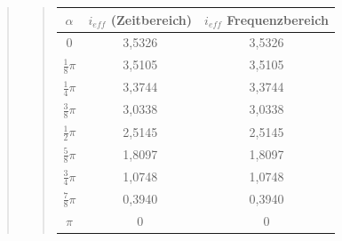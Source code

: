 \begin{quote}
\begin{quote}
\begin{center}
\begin{tabular}{|c|c|c|}
                   \hline
                   $\alpha $ & $i_{eff}$ (Zeitbereich) & $i_{eff}$ Frequenzbereich\\ \hline
                   $0$ & 3,5326 & 3,5326 \\ \hline
                   $\frac{1}{8} \pi$ & 3,5105 & 3,5105 \\ \hline
                   $\frac{1}{4} \pi$ & 3,3744 & 3,3744 \\ \hline
                   $\frac{3}{8} \pi$ & 3,0338 & 3,0338 \\ \hline
                   $\frac{1}{2} \pi$ & 2,5145 & 2,5145 \\ \hline
                   $\frac{5}{8} \pi$ & 1,8097 & 1,8097 \\ \hline
                   $\frac{3}{4} \pi$ & 1,0748 & 1,0748 \\ \hline
                   $\frac{7}{8} \pi$ & 0,3940 & 0,3940 \\ \hline
                   $ \pi$ & 0 & 0 \\ \hline
                         
           
                 \end{tabular}
             \end{center}        
        
        
    \end{quote}
\end{quote}


